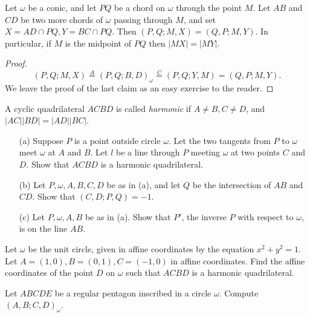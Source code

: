 \begin{thm}\label{butterfly} Let $\omega$ be a conic, and let $PQ$ be a chord on $\omega$ through the point $M$. Let $AB$ and $CD$ be two more chords of $\omega$ passing through $M$, and set $X = AD\cap PQ, Y = BC\cap PQ$. Then $(P,Q;M,X) = (Q,P;M,Y)$. In particular, if $M$ is the midpoint of $PQ$ then $|MX| = |MY|$.
\end{thm}
\begin{proof}
\[
(P,Q;M,X) \stackrel{A}{=} (P,Q;B,D)_{\omega} \stackrel{C}{=} (P,Q;Y,M) = (Q,P;M,Y).
\]
We leave the proof of the last claim as an easy exercise to the reader.
\end{proof}

\begin{defn} A cyclic quadrilateral $ACBD$ is called \emph{harmonic} if $A\ne B, C\ne D$, and $|AC||BD| = |AD||BC|$.
\end{defn}

\begin{exer}\label{harmquad}
\begin{itemize}
\item[(a)] Suppose $P$ is a point outside circle $\omega$. Let the two tangents from $P$ to $\omega$ meet $\omega$ at $A$ and $B$. Let $l$ be a line through $P$ meeting $\omega$ at two points $C$ and $D$. Show that $ACBD$ is a harmonic quadrilateral.

\item[(b)] Let $P,\omega,A,B,C,D$ be as in (a), and let $Q$ be the intersection of $AB$ and $CD$. Show that $(C,D;P,Q) = -1$.

\item[(c)] Let $P,\omega,A,B$ be as in (a). Show that $P'$, the inverse $P$ with respect to $\omega$, is on the line $AB$.
\end{itemize}
\end{exer}

\begin{exer} Let $\omega$ be the unit circle, given in affine coordinates by the equation $x^2+y^2 = 1$. Let $A = (1,0), B = (0,1), C = (-1,0)$ in affine coordinates. Find the affine coordinates of the point $D$ on $\omega$ such that $ACBD$ is a harmonic quadrilateral.
\end{exer}

\begin{exer} Let $ABCDE$ be a regular pentagon inscribed in a circle $\omega$. Compute $(A,B;C,D)_\omega$.
\end{exer}

